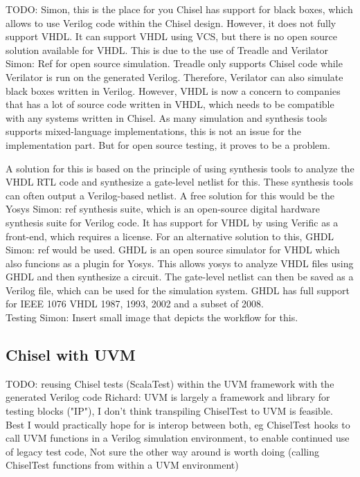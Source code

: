 \documentclass[a4paper, conference]{IEEEtran}
\newcommand{\todo}[1]{{\color{olive} TODO: #1}}
\newcommand{\simon}[1]{{\color{green} Simon: #1}}
\newcommand{\ducky}[1]{{\color{orange} Richard: #1}}
\begin{document}
\todo{Simon, this is the place for you}
Chisel has support for black boxes, which allows to use Verilog code within the Chisel design. However, it does not fully support VHDL. It can support VHDL using VCS, but there is no open source solution available for VHDL. This is due to the use of Treadle and Verilator \simon{Ref} for open source simulation. Treadle only supports Chisel code while Verilator is run on the generated Verilog. Therefore, Verilator can also simulate black boxes written in Verilog. However, VHDL is now a concern to companies that has a lot of source code written in VHDL, which needs to be compatible with any systems written in Chisel. As many simulation and synthesis tools supports mixed-language implementations, this is not an issue for the implementation part. But for open source testing, it proves to be a problem.

A solution for this is based on the principle of using synthesis tools to analyze the VHDL RTL code and synthesize a gate-level netlist for this. These synthesis tools can often output a Verilog-based netlist. A free solution for this would be the Yosys \simon{ref} synthesis suite, which is an open-source digital hardware synthesis suite for Verilog code. It has support for VHDL by using Verific as a front-end, which requires a license. For an alternative solution to this, GHDL \simon{ref} would be used. GHDL is an open source simulator for VHDL which also funcions as a plugin for Yosys. This allows yosys to analyze VHDL files using GHDL and then synthesize a circuit. The gate-level netlist can then be saved as a Verilog file, which can be used for the simulation system. GHDL has full support for IEEE 1076 VHDL 1987, 1993, 2002 and a subset of 2008.\\


Testing
\simon{Insert small image that depicts the workflow for this.}


\subsection{Chisel with UVM}

\todo{reusing Chisel tests (ScalaTest) within the UVM framework
with the generated Verilog code}
\ducky{UVM is largely a framework and library for testing blocks ("IP"), I don't think transpiling ChiselTest to UVM is feasible. Best I would practically hope for is interop between both, eg ChiselTest hooks to call UVM functions in a Verilog simulation environment, to enable continued use of legacy test code, Not sure the other way around is worth doing (calling ChiselTest functions from within a UVM environment)}
\end{document}
